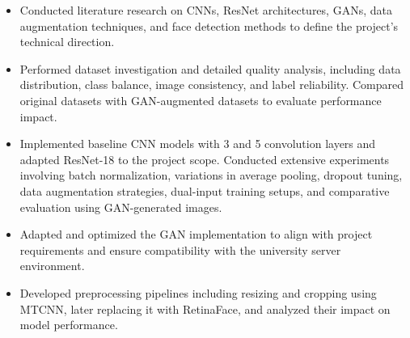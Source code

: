 \begin{itemize}

\item Conducted literature research on CNNs, ResNet architectures, GANs, data augmentation techniques, and face detection methods to define the project’s technical direction.

\item Performed dataset investigation and detailed quality analysis, including data distribution, class balance, image consistency, and label reliability. Compared original datasets with GAN-augmented datasets to evaluate performance impact.

\item Implemented baseline CNN models with 3 and 5 convolution layers and adapted ResNet-18 to the project scope. Conducted extensive experiments involving batch normalization, variations in average pooling, dropout tuning, data augmentation strategies, dual-input training setups, and comparative evaluation using GAN-generated images.

\item Adapted and optimized the GAN implementation to align with project requirements and ensure compatibility with the university server environment.

\item Developed preprocessing pipelines including resizing and cropping using MTCNN, later replacing it with RetinaFace, and analyzed their impact on model performance.

\end{itemize}
